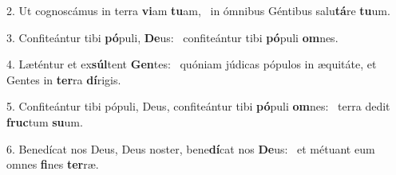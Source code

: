 2. Ut cognoscámus in terra \textbf{vi}am \textbf{tu}am, \ast\  in ómnibus Géntibus salu\textbf{tá}re \textbf{tu}um.\

3. Confiteántur tibi \textbf{pó}puli, \textbf{De}us: \ast\  confiteántur tibi \textbf{pó}puli \textbf{om}nes.\

4. Læténtur et ex\textbf{súl}tent \textbf{Gen}tes: \ast\  quóniam júdicas pópulos in æquitáte, et Gentes in \textbf{ter}ra \textbf{dí}rigis.\

5. Confiteántur tibi pópuli, Deus, confiteántur tibi \textbf{pó}puli \textbf{om}nes: \ast\  terra dedit \textbf{fruc}tum \textbf{su}um.\

6. Benedícat nos Deus, Deus noster, bene\textbf{dí}cat nos \textbf{De}us: \ast\  et métuant eum omnes \textbf{fi}nes \textbf{ter}ræ.\

